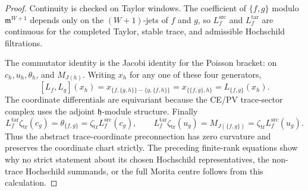 \begin{proof}
Continuity is checked on Taylor windows.  The coefficient of
\(\{f,g\}\) modulo \(\mathfrak m^{W+1}\) depends only on the
\((W+1)\)-jets of \(f\) and \(g\), so \(L_f^{\mathrm{src}}\) and
\(L_f^{\mathrm{tar}}\) are continuous for the completed Taylor, stable
trace, and admissible Hochschild filtrations.

The commutator identity is the Jacobi identity for the Poisson bracket:
on \(c_h,u_h,\theta_h\), and \(M_{J(h)}\).  Writing \(x_h\) for any
one of these four generators,
\[
  [L_f,L_g](x_h)
  =
  x_{\{f,\{g,h\}\}-\{g,\{f,h\}\}}
  =
  x_{\{\{f,g\},h\}}
  =
  L_{\{f,g\}}(x_h).
\]
The coordinate differentials are equivariant because the CE/PV
trace-sector complex uses the adjoint \(\mathfrak h\)-module structure.
Finally
\[
  L_f^{\mathrm{tar}}\zeta_{\mathrm{tr}}(c_g)
  =
  \theta_{\{f,g\}}
  =
  \zeta_{\mathrm{tr}}L_f^{\mathrm{src}}(c_g),
  \qquad
  L_f^{\mathrm{tar}}\zeta_{\mathrm{tr}}(u_g)
  =
  M_{J(\{f,g\})}
  =
  \zeta_{\mathrm{tr}}L_f^{\mathrm{src}}(u_g).
\]
Thus the abstract trace-coordinate preconnection has zero curvature
and preserves the coordinate chart strictly.  The preceding
finite-rank equations show why no strict statement about its chosen
Hochschild representatives, the non-trace Hochschild summands, or the
full Morita centre follows from this calculation.
\end{proof}

